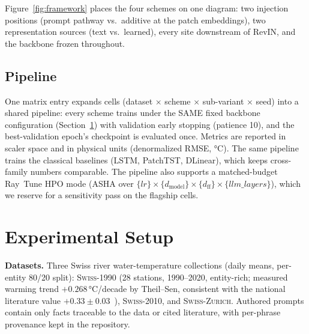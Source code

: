\documentclass[sigconf,review]{acmart}
\newcommand{\swiss}{\textsc{Swiss-1990}}
\newcommand{\swissb}{\textsc{Swiss-2010}}
\newcommand{\swissc}{\textsc{Swiss-Zurich}}
\begin{document}
Figure~\ref{fig:framework} places the four schemes on one diagram: two injection
positions (prompt pathway vs.\ additive at the patch embeddings), two
representation sources (text vs.\ learned), every site downstream of RevIN, and
the backbone frozen throughout.

\subsection{Pipeline}

One matrix entry expands cells (dataset $\times$ scheme $\times$ sub-variant
$\times$ seed) into a shared pipeline: every scheme trains under the SAME fixed
backbone configuration (Section~\ref{sec:setup}) with validation early stopping
(patience 10), and the best-validation epoch's checkpoint is evaluated once.
Metrics are reported in scaler space and in physical units (denormalized RMSE,
°C). The same pipeline trains the classical baselines (LSTM, PatchTST, DLinear),
which keeps cross-family numbers comparable. The pipeline also supports a
matched-budget Ray~Tune HPO mode (ASHA over
$\{lr\}\times\{d_{\mathrm{model}}\}\times\{d_{\mathrm{ff}}\}\times\{\mathit{llm\_layers}\}$),
which we reserve for a sensitivity pass on the flagship cells.

\section{Experimental Setup}
\label{sec:setup}

\textbf{Datasets.} Three Swiss river water-temperature collections (daily means,
per-entity 80/20 split): \swiss{} (28 stations, 1990--2020, entity-rich; measured
warming trend $+0.268$\,°C/decade by Theil--Sen, consistent with the national
literature value $+0.33\pm0.03$~\cite{michel2020}), \swissb{}, and \swissc{}.
Authored prompts contain only facts traceable to the data or cited literature, with
per-phrase provenance kept in the repository.
\end{document}
